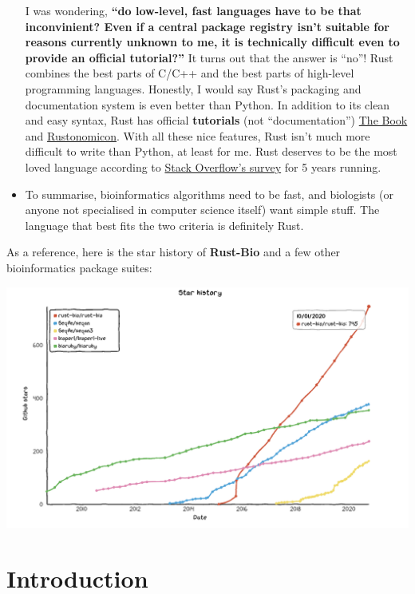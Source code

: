 \documentclass[
]{book}
\begin{document}
\begin{itemize}
  I was wondering, \textbf{``do low-level, fast languages have to be that inconvinient? Even if a central package registry isn't suitable for reasons currently unknown to me, it is technically difficult even to provide an official tutorial?''} It turns out that the answer is ``no''! Rust combines the best parts of C/C++ and the best parts of high-level programming languages. Honestly, I would say Rust's packaging and documentation system is even better than Python. In addition to its clean and easy syntax, Rust has official \textbf{tutorials} (not ``documentation'') \href{https://doc.rust-lang.org/book/}{The Book} and \href{https://doc.rust-lang.org/nomicon/}{Rustonomicon}. With all these nice features, Rust isn't much more difficult to write than Python, at least for me. Rust deserves to be the most loved language according to \href{https://insights.stackoverflow.com/survey/2020\#technology-most-loved-dreaded-and-wanted-languages-loved}{Stack Overflow's survey} for 5 years running.
\item
  To summarise, bioinformatics algorithms need to be fast, and biologists (or anyone not specialised in computer science itself) want simple stuff. The language that best fits the two criteria is definitely Rust.
\end{itemize}

As a reference, here is the star history of \textbf{Rust-Bio} and a few other bioinformatics package suites:

\includegraphics[width=1\linewidth]{img/star-history-2020-10}

\hypertarget{introduction}{%
\chapter*{Introduction}\label{introduction}}
\end{document}
